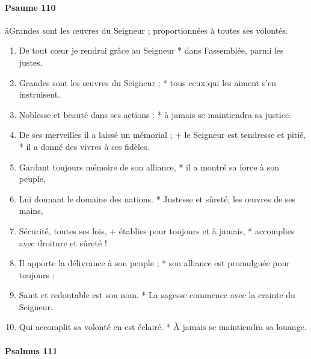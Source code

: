 \documentclass[twoside]{article}
\begin{document}
\begin{paracol}[1]{2}
\paragraph{Psaume 110}
\aa Grandes sont les œuvres du Seigneur ;
proportionnées à toutes ses volontés.



\begin{enumerate}[wide, itemsep=0mm, labelwidth=!, labelindent=0pt, label=\color{gregoriocolor}\theenumi]
\item De tout cœur je rendrai grâce au Seigneur *
dans l'assemblée, parmi les justes.
\item Grandes sont les œuvres du Seigneur ; *
tous ceux qui les aiment s'en instruisent.
\item Noblesse et beauté dans ses actions : *
à jamais se maintiendra sa justice.
\item De ses merveilles il a laissé un mémorial ; +
le Seigneur est tendresse et pitié, *
il a donné des vivres à ses fidèles.
\item Gardant toujours mémoire de son alliance, *
il a montré sa force à son peuple,
\item Lui donnant le domaine des nations. *
 Justesse et sûreté, les œuvres de ses mains, 
\item Sécurité, toutes ses lois, +
établies pour toujours et à jamais, *
accomplies avec droiture et sûreté !

\item Il apporte la délivrance à son peuple ; *
son alliance est promulguée pour toujours :

\item {} Saint et redoutable est son nom. *
 La sagesse commence avec la crainte du Seigneur.
\item Qui accomplit sa volonté en est éclairé. *
À jamais se maintiendra sa louange.
\end{enumerate}
\newpage
\switchcolumn*

\paragraph{Psalmus 111}




\end{paracol}
\end{document}
